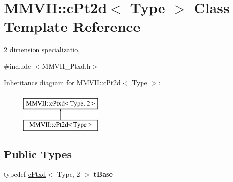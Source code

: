 \hypertarget{classMMVII_1_1cPt2d}{}\section{M\+M\+V\+II\+:\+:c\+Pt2d$<$ Type $>$ Class Template Reference}
\label{classMMVII_1_1cPt2d}


2 dimension specializatio,  




{\ttfamily \#include $<$M\+M\+V\+I\+I\+\_\+\+Ptxd.\+h$>$}

Inheritance diagram for M\+M\+V\+II\+:\+:c\+Pt2d$<$ Type $>$\+:\begin{figure}[H]
\begin{center}
\leavevmode
\includegraphics[height=2.000000cm]{classMMVII_1_1cPt2d}
\end{center}
\end{figure}
\subsection*{Public Types}
\begin{DoxyCompactItemize}
\item 
typedef \hyperlink{classMMVII_1_1cPtxd}{c\+Ptxd}$<$ Type, 2 $>$ {\bfseries t\+Base}\hypertarget{classMMVII_1_1cPt2d_a002a8a48ba440acc3a6e634f68e08893}{}\label{classMMVII_1_1cPt2d_a002a8a48ba440acc3a6e634f68e08893}

\end{DoxyCompactItemize}
